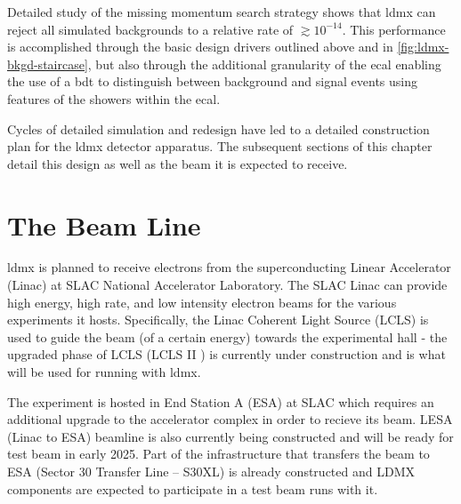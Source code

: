 Detailed study of the missing momentum search
strategy\cite{ldmx-whitepaper,ldmx-photon-reject-2020,ldmx-8gev-2023} shows that \ac{ldmx} can
reject all simulated backgrounds to a relative rate of $\gtrsim 10^{-14}$. This performance is
accomplished through the basic design drivers outlined above and in \cref{fig:ldmx-bkgd-staircase},
but also through the additional granularity of the \ac{ecal} enabling the use of a \ac{bdt} to
distinguish between background and signal events using features of the showers within the
\ac{ecal}.

Cycles of detailed simulation and redesign have led to a detailed construction plan for the
\ac{ldmx} detector apparatus. The subsequent sections of this chapter detail this design as well as
the beam it is expected to receive.

\section{The Beam Line}
\ac{ldmx} is planned to receive electrons from the superconducting Linear Accelerator (Linac)
at SLAC National Accelerator Laboratory.
The SLAC Linac can provide high energy, high rate, and low intensity electron beams for
the various experiments it hosts.
Specifically, the Linac Coherent Light Source (LCLS) is used to guide the beam (of a certain energy)
towards the experimental hall
- the upgraded phase of LCLS (LCLS II \cite{lcls-ii}) is currently under construction and is what will
be used for running with \ac{ldmx}.

The experiment is hosted in End Station A (ESA) at SLAC which requires an additional upgrade to the
accelerator complex in order to recieve its beam. LESA (Linac to ESA) beamline \cite{lesa-design} is also
currently being constructed and will be ready for test beam in early 2025. Part of the
infrastructure that transfers the beam to ESA (Sector 30 Transfer Line -- S30XL) is already
constructed and LDMX components are expected to participate in a test beam runs with it.


